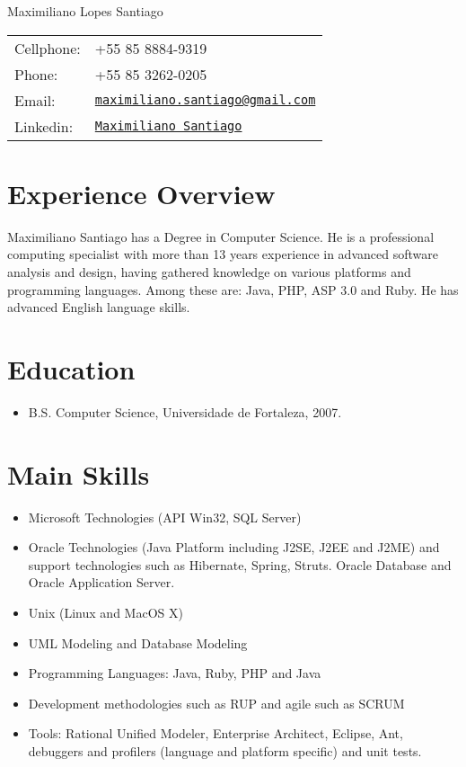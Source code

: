 \documentclass[letterpaper]{article}
\def\name{Maximiliano Lopes Santiago}
\begin{document}
\begin{flushright}

{\huge \name}


\vspace{0.25in}
\begin{minipage}{0.45\linewidth}
  \begin{tabular}{ll}
    Cellphone: & +55 85 8884-9319 \\
    Phone: &  +55 85 3262-0205 \\
    Email: & \href{mailto:maximiliano.santiago@gmail.com}{\tt maximiliano.santiago@gmail.com} \\
	Linkedin: & \href{http://www.linkedin.com/pub/maximiliano-santiago/a/145/b2a}{\tt Maximiliano Santiago} \\
  \end{tabular}
\end{minipage}
\end{flushright}
\section*{Experience Overview}

Maximiliano Santiago has a Degree in Computer Science. He is a professional computing
specialist with more than 13 years experience in advanced software analysis and design,
having gathered knowledge on various platforms and programming languages. Among these
are: Java, PHP, ASP 3.0 and Ruby.
He has advanced English language skills.


\section*{Education}

\begin{itemize}
  \item B.S. Computer Science, Universidade de Fortaleza, 2007.
\end{itemize}

\section*{Main Skills}
\begin{itemize}
  \item Microsoft Technologies (API Win32, SQL Server)
  \item Oracle Technologies (Java Platform including J2SE, J2EE and J2ME) and support
    technologies such as Hibernate, Spring, Struts.
    Oracle Database and Oracle Application Server.
  \item Unix (Linux and MacOS X)
  \item UML Modeling and Database Modeling
  \item Programming Languages: Java, Ruby, PHP and Java
  \item Development methodologies such as RUP and agile such as SCRUM
  \item Tools: Rational Unified Modeler, Enterprise Architect, Eclipse, Ant, debuggers and profilers (language and platform
specific) and unit tests.
\end{itemize}
\end{document}
